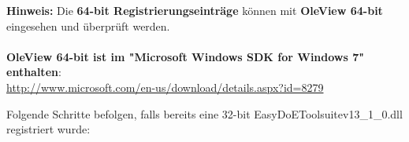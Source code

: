 \documentclass[a4paper,11pt]{article}
\begin{document}
\begin{regDll}
\begin{regDll}
\begin{regDll}
\begin{regDll}
			\item \textbf{Hinweis:} Die \textbf{64-bit Registrierungseinträge} können mit \textbf{OleView 64-bit} eingesehen und überprüft werden.
			\\
			\\ \textbf{OleView 64-bit ist im "Microsoft Windows SDK for Windows 7" enthalten}: 
			\\ \url{http://www.microsoft.com/en-us/download/details.aspx?id=8279}
			\\
			\end{regDll}
		\end{regDll}
		\item Folgende Schritte befolgen, falls bereits eine 32-bit EasyDoEToolsuitev13\_1\_0.dll registriert wurde:
		
	\end{regDll}
\end{regDll}

\end{document}
